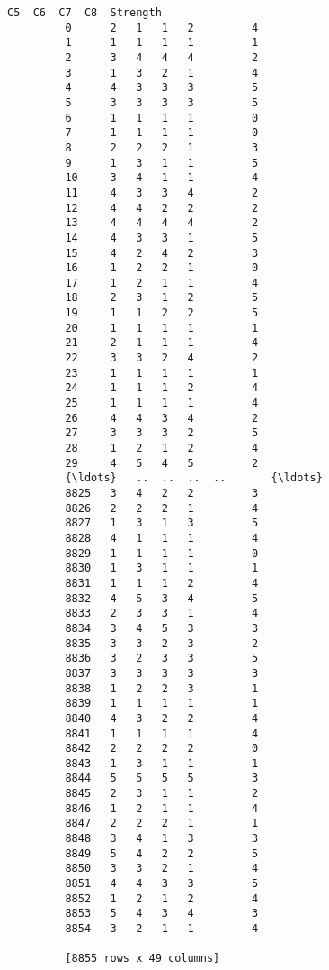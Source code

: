 \documentclass[11pt]{article}
\begin{document}
\begin{Verbatim}[commandchars=\\\{\}]
               C5  C6  C7  C8  Strength  
         0      2   1   1   2         4  
         1      1   1   1   1         1  
         2      3   4   4   4         2  
         3      1   3   2   1         4  
         4      4   3   3   3         5  
         5      3   3   3   3         5  
         6      1   1   1   1         0  
         7      1   1   1   1         0  
         8      2   2   2   1         3  
         9      1   3   1   1         5  
         10     3   4   1   1         4  
         11     4   3   3   4         2  
         12     4   4   2   2         2  
         13     4   4   4   4         2  
         14     4   3   3   1         5  
         15     4   2   4   2         3  
         16     1   2   2   1         0  
         17     1   2   1   1         4  
         18     2   3   1   2         5  
         19     1   1   2   2         5  
         20     1   1   1   1         1  
         21     2   1   1   1         4  
         22     3   3   2   4         2  
         23     1   1   1   1         1  
         24     1   1   1   2         4  
         25     1   1   1   1         4  
         26     4   4   3   4         2  
         27     3   3   3   2         5  
         28     1   2   1   2         4  
         29     4   5   4   5         2  
         {\ldots}   ..  ..  ..  ..       {\ldots}  
         8825   3   4   2   2         3  
         8826   2   2   2   1         4  
         8827   1   3   1   3         5  
         8828   4   1   1   1         4  
         8829   1   1   1   1         0  
         8830   1   3   1   1         1  
         8831   1   1   1   2         4  
         8832   4   5   3   4         5  
         8833   2   3   3   1         4  
         8834   3   4   5   3         3  
         8835   3   3   2   3         2  
         8836   3   2   3   3         5  
         8837   3   3   3   3         3  
         8838   1   2   2   3         1  
         8839   1   1   1   1         1  
         8840   4   3   2   2         4  
         8841   1   1   1   1         4  
         8842   2   2   2   2         0  
         8843   1   3   1   1         1  
         8844   5   5   5   5         3  
         8845   2   3   1   1         2  
         8846   1   2   1   1         4  
         8847   2   2   2   1         1  
         8848   3   4   1   3         3  
         8849   5   4   2   2         5  
         8850   3   3   2   1         4  
         8851   4   4   3   3         5  
         8852   1   2   1   2         4  
         8853   5   4   3   4         3  
         8854   3   2   1   1         4  
         
         [8855 rows x 49 columns]
\end{Verbatim}
        
\end{document}

